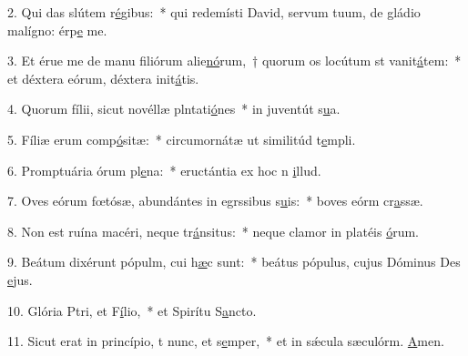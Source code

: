 2. Qui das slútem r\uline{é}gibus:~* qui redemísti David, servum tuum, de gládio malígno: érp\uline{e} me.\par 
3. Et érue me de manu filiórum alie\uline{nó}rum,~† quorum os locútum st vanit\uline{á}tem:~* et déxtera eórum, déxtera init\uline{á}tis.\par 
4. Quorum fílii, sicut novéllæ plntati\uline{ó}nes~* in juventút s\uline{u}a.\par 
5. Fíliæ erum comp\uline{ó}sitæ:~* circumornátæ ut similitúd t\uline{e}mpli.\par 
6. Promptuária órum pl\uline{e}na:~* eructántia ex hoc n \uline{i}llud.\par 
7. Oves eórum fœtósæ, abundántes in egrssibus s\uline{u}is:~* boves eórm cr\uline{a}ssæ.\par 
8. Non est ruína macéri, neque tr\uline{á}nsitus:~* neque clamor in platéis \uline{ó}rum.\par 
9. Beátum dixérunt pópulm, cui h\uline{æ}c sunt:~* beátus pópulus, cujus Dóminus Des \uline{e}jus.\par 
10. Glória Ptri, et F\uline{í}lio,~* et Spirítu S\uline{a}ncto.\par 
11. Sicut erat in princípio, t nunc, et s\uline{e}mper,~* et in sǽcula sæculórm. \uline{A}men.\par 

